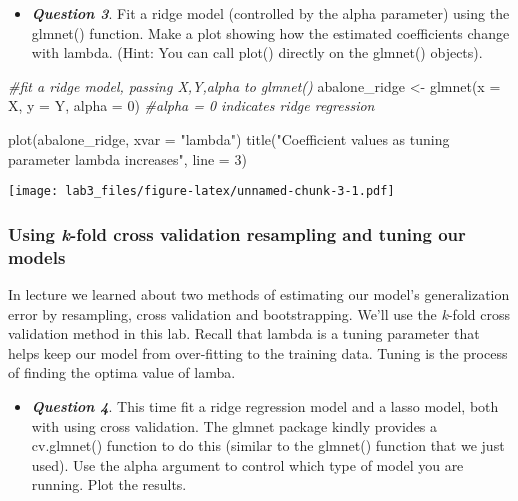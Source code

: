 \documentclass[
]{article}
\newenvironment{Shaded}{\begin{snugshade}}{\end{snugshade}}
\newcommand{\AttributeTok}[1]{\textcolor[rgb]{0.77,0.63,0.00}{#1}}
\newcommand{\CommentTok}[1]{\textcolor[rgb]{0.56,0.35,0.01}{\textit{#1}}}
\newcommand{\DecValTok}[1]{\textcolor[rgb]{0.00,0.00,0.81}{#1}}
\newcommand{\FunctionTok}[1]{\textcolor[rgb]{0.00,0.00,0.00}{#1}}
\newcommand{\NormalTok}[1]{#1}
\newcommand{\OtherTok}[1]{\textcolor[rgb]{0.56,0.35,0.01}{#1}}
\newcommand{\StringTok}[1]{\textcolor[rgb]{0.31,0.60,0.02}{#1}}
\providecommand{\tightlist}{%
  \setlength{\itemsep}{0pt}\setlength{\parskip}{0pt}}
\begin{document}
\begin{itemize}
\tightlist
\item
  \textbf{\emph{Question 3}}. Fit a ridge model (controlled by the alpha
  parameter) using the glmnet() function. Make a plot showing how the
  estimated coefficients change with lambda. (Hint: You can call plot()
  directly on the glmnet() objects).
\end{itemize}

\begin{Shaded}
\begin{Highlighting}[]
\CommentTok{\#fit a ridge model, passing X,Y,alpha to glmnet()}
\NormalTok{abalone\_ridge }\OtherTok{\textless{}{-}} \FunctionTok{glmnet}\NormalTok{(}\AttributeTok{x =}\NormalTok{ X, }
                        \AttributeTok{y =}\NormalTok{ Y, }
                        \AttributeTok{alpha =} \DecValTok{0}\NormalTok{) }\CommentTok{\#alpha = 0 indicates ridge regression }

\FunctionTok{plot}\NormalTok{(abalone\_ridge, }\AttributeTok{xvar =} \StringTok{"lambda"}\NormalTok{)}
\FunctionTok{title}\NormalTok{(}\StringTok{"Coefficient values as tuning parameter lambda increases"}\NormalTok{, }\AttributeTok{line =} \DecValTok{3}\NormalTok{)}
\end{Highlighting}
\end{Shaded}

\texttt{[image: lab3\_files/figure-latex/unnamed-chunk-3-1.pdf]}

\hypertarget{using-k-fold-cross-validation-resampling-and-tuning-our-models}{%
\subsubsection{\texorpdfstring{Using \emph{k}-fold cross validation
resampling and tuning our
models}{Using k-fold cross validation resampling and tuning our models}}\label{using-k-fold-cross-validation-resampling-and-tuning-our-models}}

In lecture we learned about two methods of estimating our model's
generalization error by resampling, cross validation and bootstrapping.
We'll use the \emph{k}-fold cross validation method in this lab. Recall
that lambda is a tuning parameter that helps keep our model from
over-fitting to the training data. Tuning is the process of finding the
optima value of lamba.

\begin{itemize}
\tightlist
\item
  \textbf{\emph{Question 4}}. This time fit a ridge regression model and
  a lasso model, both with using cross validation. The glmnet package
  kindly provides a cv.glmnet() function to do this (similar to the
  glmnet() function that we just used). Use the alpha argument to
  control which type of model you are running. Plot the results.
\end{itemize}
\end{document}
